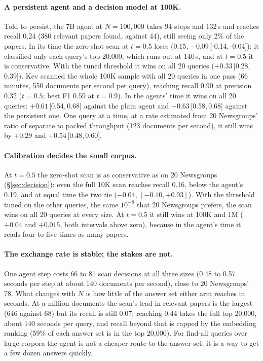 \documentclass[11pt]{article}
\newcommand{\ci}[2]{\,[#1,\,#2]}
\begin{document}
\paragraph{A persistent agent and a decision model at 100K.}
Told to persist, the 7B agent at $N=100{,}000$ takes 94 steps and 132\,s and
reaches recall 0.24 (380 relevant papers found, against 44), still seeing only
2\% of the papers. In its time the zero-shot scan at $t=0.5$ loses
($0.15$, $-0.09$\ci{-0.14}{-0.04}): it classified only each query's top 20,000,
which runs out at 140\,s, and at $t=0.5$ it is conservative. With the tuned
threshold it wins on all 20 queries ($+0.33$\ci{0.28}{0.39}). Kev scanned the whole 100K sample
with all 20 queries in one pass (66 minutes, 550 documents per second per
query), reaching recall 0.90 at precision 0.32 ($t=0.5$; best F1 0.59 at
$t=0.9$). In the agents' time it wins on all 20 queries: $+0.61$\ci{0.54}{0.68}
against the plain agent and $+0.63$\ci{0.58}{0.68} against the persistent one.
One query at a time, at a rate estimated from 20 Newsgroups' ratio of separate to
packed throughput (123 documents per second), it still wins by $+0.29$ and
$+0.54$\ci{0.48}{0.60}.

\paragraph{Calibration decides the small corpus.}
At $t=0.5$ the zero-shot scan is as conservative as on 20 Newsgroups
(\S\ref{sec:decision}): even the full 10K scan reaches recall 0.16, below the
agent's 0.19, and at equal time the two tie ($-0.04$, $[-0.10, +0.03]$). With
the threshold tuned on the other queries, the same $10^{-8}$ that 20 Newsgroups
prefers, the scan wins on all 20 queries at every size. At $t=0.5$ it still
wins at 100K and 1M ($+0.04$ and $+0.015$, both intervals above zero), because
in the agent's time it reads four to five times as many papers.

\paragraph{The exchange rate is stable; the stakes are not.}
One agent step costs 66 to 81 scan decisions at all three sizes (0.48 to 0.57
seconds per step at about 140 documents per second), close to 20 Newsgroups'
78. What changes with $N$ is how little of the answer set either arm reaches in
seconds. At a million documents the scan's lead in relevant papers is the
largest (646 against 68) but its recall is still 0.07; reaching 0.44 takes the
full top 20,000, about 140 seconds per query, and recall beyond that is capped
by the embedding ranking (59\% of each answer set is in the top 20,000). For
find-all queries over large corpora the agent is not a cheaper route to the
answer set; it is a way to get a few dozen answers quickly.
\end{document}
